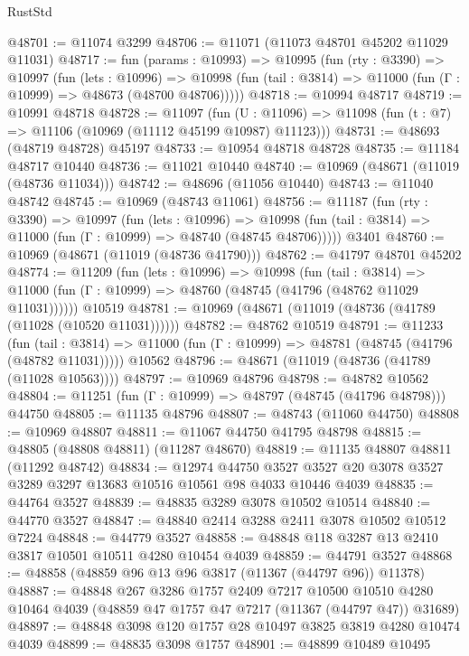 \begin{lexlean}{RustStd}
\begin{coremodule}
@48701 := @11074 @3299
@48706 := @11071 (@11073 @48701 @45202 @11029 @11031)
@48717 := fun (params : @10993) =>
  @10995
    (fun (rty : @3390) =>
    @10997
      (fun (lets : @10996) =>
      @10998 (fun (tail : @3814) => @11000 (fun (Γ : @10999) => @48673 (@48700 @48706)))))
@48718 := @10994 @48717
@48719 := @10991 @48718
@48728 := @11097
    (fun (U : @11096) => @11098 (fun (t : @7) => @11106 (@10969 (@11112 @45199 @10987) @11123)))
@48731 := @48693 (@48719 @48728) @45197
@48733 := @10954 @48718 @48728
@48735 := @11184 @48717 @10440
@48736 := @11021 @10440
@48740 := @10969 (@48671 (@11019 (@48736 @11034)))
@48742 := @48696 (@11056 @10440)
@48743 := @11040 @48742
@48745 := @10969 (@48743 @11061)
@48756 := @11187
    (fun (rty : @3390) =>
    @10997
      (fun (lets : @10996) =>
      @10998 (fun (tail : @3814) => @11000 (fun (Γ : @10999) => @48740 (@48745 @48706)))))
    @3401
@48760 := @10969 (@48671 (@11019 (@48736 @41790)))
@48762 := @41797 @48701 @45202
@48774 := @11209
    (fun (lets : @10996) =>
    @10998
      (fun (tail : @3814) =>
      @11000 (fun (Γ : @10999) => @48760 (@48745 (@41796 (@48762 @11029 @11031))))))
    @10519
@48781 := @10969 (@48671 (@11019 (@48736 (@41789 (@11028 (@10520 @11031))))))
@48782 := @48762 @10519
@48791 := @11233
    (fun (tail : @3814) => @11000 (fun (Γ : @10999) => @48781 (@48745 (@41796 (@48782 @11031)))))
    @10562
@48796 := @48671 (@11019 (@48736 (@41789 (@11028 @10563))))
@48797 := @10969 @48796
@48798 := @48782 @10562
@48804 := @11251 (fun (Γ : @10999) => @48797 (@48745 (@41796 @48798))) @44750
@48805 := @11135 @48796
@48807 := @48743 (@11060 @44750)
@48808 := @10969 @48807
@48811 := @11067 @44750 @41795 @48798
@48815 := @48805 (@48808 @48811) (@11287 @48670)
@48819 := @11135 @48807 @48811 (@11292 @48742)
@48834 := @12974
    @44750
    @3527
    @3527
    @20
    @3078
    @3527
    @3289
    @3297
    @13683
    @10516
    @10561
    @98
    @4033
    @10446
    @4039
@48835 := @44764 @3527
@48839 := @48835 @3289 @3078 @10502 @10514
@48840 := @44770 @3527
@48847 := @48840 @2414 @3288 @2411 @3078 @10502 @10512 @7224
@48848 := @44779 @3527
@48858 := @48848 @118 @3287 @13 @2410 @3817 @10501 @10511 @4280 @10454 @4039
@48859 := @44791 @3527
@48868 := @48858 (@48859 @96 @13 @96 @3817 (@11367 (@44797 @96)) @11378)
@48887 := @48848
    @267
    @3286
    @1757
    @2409
    @7217
    @10500
    @10510
    @4280
    @10464
    @4039
    (@48859 @47 @1757 @47 @7217 (@11367 (@44797 @47)) @31689)
@48897 := @48848 @3098 @120 @1757 @28 @10497 @3825 @3819 @4280 @10474 @4039
@48899 := @48835 @3098 @1757
@48901 := @48899 @10489 @10495

\end{coremodule}
\end{lexlean}
